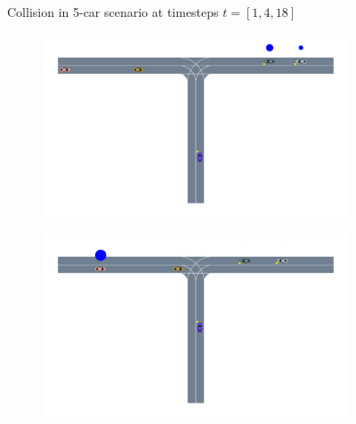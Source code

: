 \begin{figure}
\begin{subfigure}[t]{0.7\textwidth}
\end{subfigure}
    \caption{Collision in 5-car scenario at timesteps $t=[1,4,18]$}
    \label{fig:five_car_collision1}
    \vspace{-0.2in}
\end{figure}


\begin{figure}
    \centering
   \begin{subfigure}[t]{0.7\textwidth}
        \centering
        \includegraphics[width=\textwidth, trim={2cm 5cm 1cm 0},clip]{figures/problem_decomposition/f2_1.pdf}
    \end{subfigure}
    \begin{subfigure}[t]{0.7\textwidth}
        \centering
        \includegraphics[width=\textwidth, trim={2cm 5cm 1cm 0},clip]{figures/problem_decomposition/f2_8.pdf}
    \end{subfigure}
    \begin{subfigure}[t]{0.7\textwidth}
    \centering

\end{subfigure}
\end{figure}
